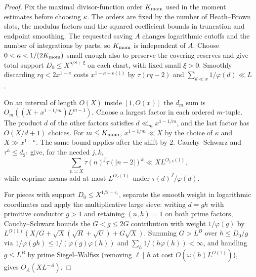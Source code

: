 \documentclass[11pt,reqno]{amsart}
\theoremstyle{remark}
\numberwithin{equation}{section}
\begin{document}
\begin{proof}
Fix the maximal divisor-function order $K_{\rm mom}$ used in the moment estimates before choosing $\kappa$. The orders are fixed by the number of Heath--Brown slots, the modulus factors and the squared coefficient bounds in truncation and endpoint smoothing. The requested saving $A$ changes logarithmic cutoffs and the number of integrations by parts, so $K_{\rm mom}$ is independent of $A$. Choose $0<\kappa<1/(2K_{\rm mom})$ small enough also to preserve the covering reserves and give total support $D_0\le X^{5/8+\xi}$ on each chart, with fixed small $\xi>0$. Smoothly discarding $rq<2x^{1-\kappa}$ costs $x^{1-\kappa+o(1)}$ by $\tau(rq-2)$ and $\sum_{d\ll x}1/\varphi(d)\ll L$.

On an interval of length $O(X)$ inside $[1,O(x)]$ the $d_m$ sum is $O_m((X+x^{1-1/m})L^{m-1})$. Choose a largest factor in each ordered $m$-tuple. The product $d$ of the other factors satisfies $d\ll_m x^{1-1/m}$, and the last factor has $O(X/d+1)$ choices. For $m\le K_{\rm mom}$, $x^{1-1/m}\ll X$ by the choice of $\kappa$ and $X\gg x^{1-\kappa}$. The same bound applies after the shift by $2$. Cauchy--Schwarz and $\tau^h\le d_{2^h}$ give, for the needed $j,k$,
\begin{equation}\label{eq:shifted_div}
\sum_{n \asymp X} \tau(n)^j \tau(|n-2|)^k \ll X L^{O_{j,k}(1)},
\end{equation}
while coprime means add at most $L^{O_J(1)}$ under $\tau(d)^J/\varphi(d)$.

For pieces with support $D_0 \le X^{1/2-\epsilon_0}$, separate the smooth weight in logarithmic coordinates and apply the multiplicative large sieve: writing $d = gh$ with primitive conductor $g > 1$ and retaining $(n,h)=1$ on both prime factors, Cauchy--Schwarz bounds the $G < g \le 2G$ contribution with weight $1/\varphi(g)$ by $L^{O(1)}(X/G + \sqrt{X}(\sqrt{R}+\sqrt{U}) + G\sqrt{X})$. Summing $G > L^B$ over $h \le D_0/g$ via $1/\varphi(gh) \le 1/(\varphi(g)\varphi(h))$ and $\sum_h 1/(h\varphi(h)) < \infty$, and handling $g \le L^B$ by prime Siegel--Walfisz (removing $\ell \mid h$ at cost $O(\omega(h)L^{O(1)})$), gives $O_A(XL^{-A})$.


\end{proof}
\end{document}
